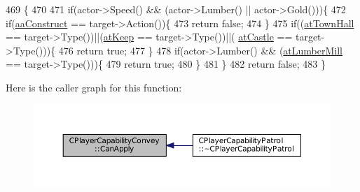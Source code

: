 \begin{DoxyCode}
469                                                                                                            
                                                   \{
470 
471     \textcolor{keywordflow}{if}(actor->Speed() && (actor->Lumber() || actor->Gold()))\{
472         \textcolor{keywordflow}{if}(\hyperlink{GameDataTypes_8h_ab47668e651a3032cfb9c40ea2d60d670a7ef6b863f66dd7dcc95a199cd758ae1d}{aaConstruct} == target->Action())\{
473             \textcolor{keywordflow}{return} \textcolor{keyword}{false};
474         \}
475         \textcolor{keywordflow}{if}((\hyperlink{GameDataTypes_8h_a5600d4fc433b83300308921974477feca5c0fa8a0f367f3358365536d3c7aa321}{atTownHall} == target->Type())||(\hyperlink{GameDataTypes_8h_a5600d4fc433b83300308921974477fecaaed39451bedb0392ad95fbc9c95bef31}{atKeep} == target->Type())||(
      \hyperlink{GameDataTypes_8h_a5600d4fc433b83300308921974477feca6727b47855e74f3f7b6e4a96d0c2a42a}{atCastle} == target->Type()))\{
476             \textcolor{keywordflow}{return} \textcolor{keyword}{true};
477         \}
478         \textcolor{keywordflow}{if}(actor->Lumber() && (\hyperlink{GameDataTypes_8h_a5600d4fc433b83300308921974477feca7bb38316bc3193b5c9ec67ea6aad549c}{atLumberMill} == target->Type()))\{
479             \textcolor{keywordflow}{return} \textcolor{keyword}{true};    
480         \}
481     \}
482     \textcolor{keywordflow}{return} \textcolor{keyword}{false};
483 \}
\end{DoxyCode}
Here is the caller graph for this function\+:\nopagebreak
\begin{figure}[H]
\begin{center}
\leavevmode
\includegraphics[width=350pt]{classCPlayerCapabilityConvey_a795b3eb4c3879a6d7da1cba7962a1c78_icgraph}
\end{center}
\end{figure}
\hypertarget{classCPlayerCapabilityConvey_a6c5ebd62a9c3a619c56e070aca5443a7}{}\label{classCPlayerCapabilityConvey_a6c5ebd62a9c3a619c56e070aca5443a7} 

